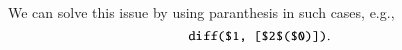 We can solve this issue by using paranthesis in such cases, e.g., 
\begin{equation}
\verb|diff($1, [$2$($0)])|.
\end{equation}





